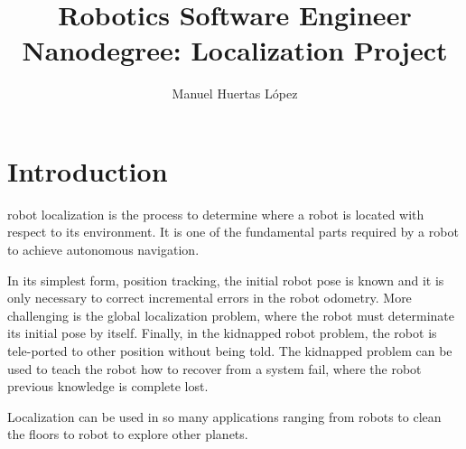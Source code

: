 \documentclass[10pt,journal,compsoc]{IEEEtran}
\begin{document}
\title{Robotics Software Engineer Nanodegree: Localization Project}

\author{Manuel Huertas L\'opez}

%
{}


\maketitle
\IEEEdisplaynontitleabstractindextext
\IEEEpeerreviewmaketitle

\section{Introduction}
\label{sec:introduction}
 robot localization is the process to determine where a robot is located with respect to its environment. It is one of the fundamental parts required by a robot to achieve autonomous navigation.

In its simplest form, position tracking, the initial robot pose is known and it is only necessary to correct incremental errors in the robot odometry. More challenging is the global localization problem, where the robot must determinate its initial pose by itself. Finally, in the kidnapped robot problem, the robot is tele-ported to other position without being told. The kidnapped problem can be used to teach the robot how to recover from a system fail, where the robot previous knowledge is complete lost.

Localization can be used in so many applications ranging from robots to clean the floors to robot to explore other planets.
\end{document}
